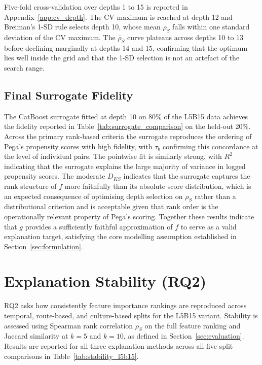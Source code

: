 \documentclass[oneside]{memoir} %
\begin{document}
Five-fold cross-validation over depths 1 to 15 is reported in Appendix~\ref{app:cv_depth}. The CV-maximum is reached at depth 12 and Breiman's 1-SD rule selects depth 10, whose mean $\rho_S$ falls within one standard deviation of the CV maximum. The $\bar{\rho}_S$ curve plateaus across depths 10 to 13 before declining marginally at depths 14 and 15, confirming that the optimum lies well inside the grid and that the 1-SD selection is not an artefact of the search range.

\subsection{Final Surrogate Fidelity}

The CatBoost surrogate fitted at depth 10 on 80\% of the L5B15 data achieves the fidelity reported in Table~\ref{tab:surrogate_comparison} on the held-out 20\%. Across the primary rank-based criteria the surrogate reproduces the ordering of Pega's propensity scores with high fidelity, with $\tau_b$ confirming this concordance at the level of individual pairs. The pointwise fit is similarly strong, with $R^2$ indicating that the surrogate explains the large majority of variance in logged propensity scores. The moderate $D_{KS}$ indicates that the surrogate captures the rank structure of $f$ more faithfully than its absolute score distribution, which is an expected consequence of optimising depth selection on $\rho_S$ rather than a distributional criterion and is acceptable given that rank order is the operationally relevant property of Pega's scoring. Together these results indicate that $g$ provides a sufficiently faithful approximation of $f$ to serve as a valid explanation target, satisfying the core modelling assumption established in Section~\ref{sec:formulation}.

\section{Explanation Stability (RQ2)} \label{sec:rq2}

RQ2 asks how consistently feature importance rankings are reproduced across temporal, route-based, and culture-based splits for the L5B15 variant. Stability is assessed using Spearman rank correlation $\rho_S$ on the full feature ranking and Jaccard similarity at $k = 5$ and $k = 10$, as defined in Section~\ref{sec:evaluation}. Results are reported for all three explanation methods across all five split comparisons in Table~\ref{tab:stability_l5b15}.
\end{document}
